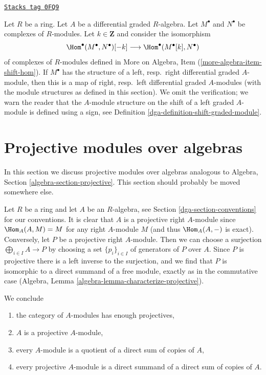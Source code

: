 \begin{remark}
\label{dga-remark-shift-dual}
\href{https://stacks.math.columbia.edu/tag/0FQ9}{\texttt{Stacks tag 0FQ9}}

Let $R$ be a ring. Let $A$ be a differential graded $R$-algebra.
Let $M^\bullet$ and $N^\bullet$ be complexes of $R$-modules.
Let $k \in \mathbf{Z}$ and consider the isomorphism
$$
\Hom^\bullet(M^\bullet, N^\bullet)[-k]
\longrightarrow
\Hom^\bullet(M^\bullet[k], N^\bullet)
$$
of complexes of $R$-modules defined in
More on Algebra, Item (\ref{more-algebra-item-shift-hom}).
If $M^\bullet$ has the structure of a left, resp.\ right
differential graded $A$-module, then this is a map of
right, resp.\ left differential graded $A$-modules (with the
module structures as defined in this section).
We omit the verification; we warn the reader that the
$A$-module structure on the shift of a left graded $A$-module
is defined using a sign, see
Definition \ref{dga-definition-shift-graded-module}.
\end{remark}

\section{Projective modules over algebras}
\label{dga-section-projectives-over-algebras}
In this section we discuss projective modules over algebras analogous to
Algebra, Section \ref{algebra-section-projective}.
This section should probably be moved somewhere else.

\medskip\noindent
Let $R$ be a ring and let $A$ be an $R$-algebra, see
Section \ref{dga-section-conventions} for our conventions.
It is clear that $A$ is a projective right $A$-module since
$\Hom_A(A, M) = M$ for any right $A$-module $M$ (and thus $\Hom_A(A, -)$
is exact). Conversely, let $P$ be a projective right $A$-module. Then
we can choose a surjection
$\bigoplus_{i \in I} A \to P$ by choosing a set $\{p_i\}_{i \in I}$
of generators of $P$ over $A$. Since $P$ is projective there is a
left inverse to the surjection, and we find that $P$ is isomorphic
to a direct summand of a free module, exactly as in the commutative case
(Algebra, Lemma \ref{algebra-lemma-characterize-projective}).

\medskip\noindent
We conclude
\begin{enumerate}
\item the category of $A$-modules has enough projectives,
\item $A$ is a projective $A$-module,
\item every $A$-module is a quotient of a direct sum of copies of $A$,
\item every projective $A$-module is a direct summand of a direct
sum of copies of $A$.
\end{enumerate}

